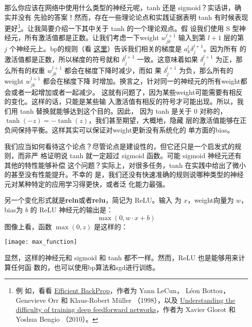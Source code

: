 那么你应该在网络中使用什么类型的神经元呢，tanh 还是 sigmoid？实话讲，确实并没有
先验的答案！然而，存在一些理论论点和实践证据表明 tanh 有时候表现更好\footnote{例
  如，看看 \href{http://yann.lecun.com/exdb/publis/pdf/lecun-98b.pdf}{Efficient
    BackProp}，作者为 Yann LeCun， Léon Bottou， Genevieve Orr 和 Klaus-Robert
  Müller （1998），以及
  \href{http://jmlr.org/proceedings/papers/v9/glorot10a/glorot10a.pdf}{Understanding
    the difficulty of training deep feedforward networks}，作者为 Xavier Glorot
  和 Yoshua Bengio （2010）。}。让我简要介绍一下其中关于 tanh 的一个理论观点。假
设我们使用 S 型神经元，所有激活值都是正数。让我们考虑一下\gls*{weight}
$w_{jk}^{l+1}$ 输入到第 $l+1$ 层的第 $j$ 个神经元上。\gls*{bp}的规则（看%
  \hyperref[eq:bp4]{这里}）告诉我们相关的梯度是 $a_k^l\delta_j^{l+1}$。因为所有
的激活值都是正数，所以梯度的符号就和 $\delta_j^{l+1}$ 一致。这意味着如果
$\delta_j^{l+1}$ 为正，那么所有的权重 $w_{jk}^{l+1}$ 都会在梯度下降时减少，而如
果 $\delta_j^{l+1}$ 为负，那么所有的\gls*{weight} $w_{jk}^{l+1}$ 都会在梯度下降
时增加。换言之，针对同一的神经元的所有\gls*{weight}都会或者一起增加或者一起减少。
这就有问题了，因为某些\gls*{weight}可能需要有相反的变化。这样的话，只能是某些输
入激活值有相反的符号才可能出现。所以，我们用 tanh 替换就能够达到这个目的。因此，
因为 tanh 是关于 $0$ 对称的，$\tanh(-z) = -\tanh(z)$，我们甚至期望，大概地，隐藏
层的激活值能够在正负间保持平衡。这样其实可以保证对\gls*{weight}更新没有系统化的
单方面的\gls*{bias}。

我们应当如何看待这个论点？尽管论点是建设性的，但它还只是一个启发式的规则，而非严
格证明说 tanh 就一定超过 sigmoid 函数。可能 sigmoid 神经元还有其他的特性能够补偿
这个问题？实际上，对很多任务，tanh 在实践中给出了微小的甚至没有性能提升。不幸的
是，我们还没有快速准确的规则说哪种类型的神经元对某种特定的应用学习得更快，或者泛
化能力最强。

另一个变化形式就是\textbf{\gls{reln}}或者\textbf{\gls{relu}}，简记为 ReLU。输入
为 $x$，\gls*{weight}向量为 $w$，\gls*{bias}为 $b$ 的 ReLU 神经元的输出是：
\begin{equation}
  \max(0, w \cdot x+b)
  \label{eq:112}\tag{112}
\end{equation}
图像上看，函数 $\max(0,z)$ 是这样的：
\begin{center}
  \texttt{[image: max\_function]}
\end{center}

显然，这样的神经元和 sigmoid 和 tanh 都不一样。然而，ReLU 也是能够用来计算任何函
数的，也可以使用\gls*{bp}算法和\gls*{sgd}进行训练。

